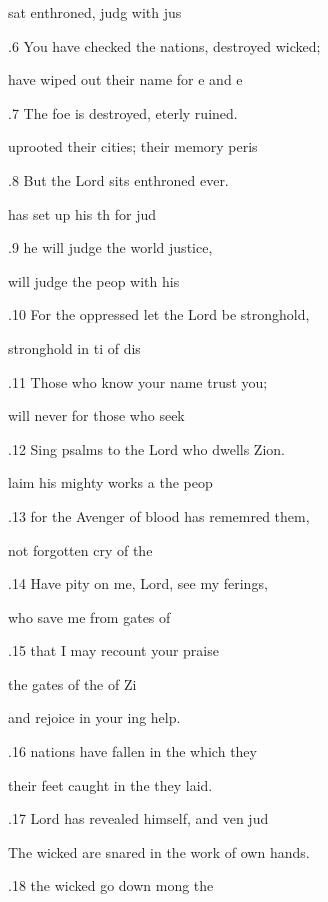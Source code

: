  sat enthroned, judg with jus 

.6 You have checked the nations, destroyed  wicked; 

 have wiped out their name for e and e 

.7 The foe is destroyed, eterly ruined. 

 uprooted their cities; their memory  peris 

.8 But the Lord sits enthroned  ever. 

 has set up his th for jud 

.9 he will judge the world  justice, 

 will judge the peop with his  

.10 For the oppressed let the Lord be  stronghold, 

 stronghold in ti of dis 

.11 Those who know your name  trust you; 

 will never for those who seek  

.12 Sing psalms to the Lord who dwells  Zion. 

laim his mighty works a the peop 

.13 for the Avenger of blood has rememred them, 

 not forgotten  cry of the  

.14 Have pity on me, Lord, see my ferings, 

 who save me from  gates of  

.15 that I may recount  your praise 

 the gates of the  of Zi 

and rejoice in your ing help. 

.16  nations have fallen in the  which they  

their feet caught in the  they laid. 

.17  Lord has revealed himself, and ven jud 

The wicked are snared in the work of  own hands. 

.18  the wicked go down mong the  

